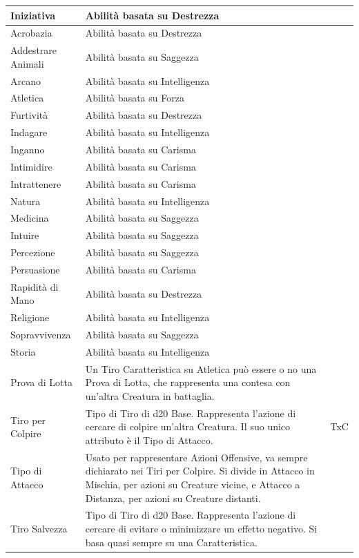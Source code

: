 \documentclass[a4paper, 11pt]{article}
\begin{document}
\begin{center}
\begin{longtable}{ |p{3.5cm}|p{9cm}|p{3cm}|  }
        Iniziativa & Abilità basata su Destrezza & \\\hline
        Acrobazia & Abilità basata su Destrezza & \\\hline
        Addestrare Animali & Abilità basata su Saggezza &   \\\hline
        Arcano & Abilità basata su Intelligenza & \\\hline
        Atletica &Abilità basata su Forza&\\\hline
        Furtività & Abilità basata su Destrezza & \\\hline
        Indagare & Abilità basata su Intelligenza & \\\hline
    Inganno & Abilità basata su Carisma & \\\hline
    Intimidire & Abilità basata su Carisma & \\\hline
    Intrattenere & Abilità basata su Carisma & \\\hline
    Natura & Abilità basata su Intelligenza & \\\hline
    Medicina &Abilità basata su Saggezza & \\\hline
    Intuire &Abilità basata su Saggezza & \\\hline
    Percezione &Abilità basata su Saggezza & \\\hline
    Persuasione & Abilità basata su Carisma & \\\hline
    Rapidità di Mano & Abilità basata su Destrezza & \\\hline
    Religione & Abilità basata su Intelligenza & \\\hline
    Sopravvivenza & Abilità basata su Saggezza & \\\hline
    Storia & Abilità basata su Intelligenza & \\\hline
    Prova di Lotta & Un Tiro Caratteristica su Atletica può essere o no una Prova di Lotta, che rappresenta una contesa con un'altra Creatura in battaglia. & \\\hline
    Tiro per Colpire & Tipo di Tiro di d20 Base. Rappresenta l’azione di cercare di colpire un’altra Creatura. Il suo unico attributo è il Tipo di Attacco. & TxC \\\hline
    Tipo di Attacco & Usato per rappresentare Azioni Offensive, va sempre dichiarato nei Tiri per Colpire. Si divide in Attacco in Mischia, per azioni su Creature vicine, e Attacco a Distanza, per azioni su Creature distanti. & \\\hline
    Tiro Salvezza & Tipo di Tiro di d20 Base. Rappresenta l’azione di cercare di evitare o minimizzare un effetto negativo. Si basa quasi sempre su una Caratteristica. & \\\hline

\end{longtable}
\end{center}
\end{document}
